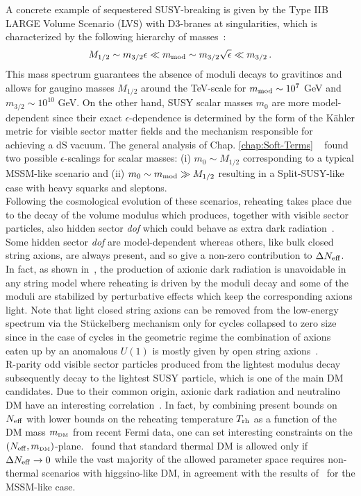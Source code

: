 \documentclass[12pt,a4paper]{book}
\def\DM{{\scriptscriptstyle \rm DM}}
\begin{document}
A concrete example of sequestered SUSY-breaking is given by the Type IIB LARGE Volume Scenario (LVS) with D3-branes at singularities, which is characterized by the following hierarchy of masses~\cite{Blumenhagen:2009gk}:
\begin{align}
M_{1/2}\sim m_{3/2} \epsilon \ll m_{\rm mod} \sim m_{3/2} \sqrt{\epsilon} \ll m_{3/2}\,.
\label{masses}
\end{align}
This mass spectrum guarantees the absence of moduli decays to gravitinos and allows for gaugino masses $M_{1/2}$ around the TeV-scale for $m_{\rm mod}\sim 10^7$ GeV and $m_{3/2}\sim 10^{10}$ GeV. On the other hand, SUSY scalar masses $m_0$ are more model-dependent since their exact $\epsilon$-dependence is determined by the form of the K\"ahler metric for visible sector matter fields and the mechanism responsible for achieving a dS vacuum. The general analysis of Chap. \ref{chap:Soft-Terms} ~\cite{Aparicio:2014wxa} found two possible $\epsilon$-scalings for scalar masses: (i) $m_0\sim M_{1/2}$ corresponding to a typical MSSM-like scenario and (ii) $m_0 \sim m_{\rm mod} \gg M_{1/2}$ resulting in a Split-SUSY-like case with heavy squarks and sleptons.\\

Following the cosmological evolution of these scenarios, reheating takes place due to the decay of the volume modulus which produces, together with visible sector particles, also hidden sector \textit{dof} which could behave as extra dark radiation~\cite{Cicoli:2012aq, Higaki:2012ar}. Some hidden sector \textit{dof} are model-dependent whereas others, like bulk closed string axions, are always present, and so give a non-zero contribution to $\Delta N_{\rm eff}$. In fact, as shown in~\cite{Allahverdi:2014ppa}, the production of axionic dark radiation is unavoidable in any string model where reheating is driven by the moduli decay and some of the moduli are stabilized by perturbative effects which keep the corresponding axions light. Note that light closed string axions can be removed from the low-energy spectrum via the St\"uckelberg mechanism only for cycles collapsed to zero size since in the case of cycles in the geometric regime the combination of axions eaten up by an anomalous $U(1)$ is mostly given by open string axions~\cite{Allahverdi:2014ppa}.\\

R-parity odd visible sector particles produced from the lightest modulus decay subsequently decay to the lightest SUSY particle, which is one of the main DM candidates. Due to their common origin, axionic dark radiation and neutralino DM have an interesting correlation~\cite{Allahverdi:2014ppa}. In fact, by combining present bounds on $N_{\rm eff}$ with lower bounds on the reheating temperature $T_{\rm rh}$ as a function of the DM mass $m_\DM$ from recent Fermi data, one can set interesting constraints on the $(N_{\rm eff}, m_\DM)$-plane.~\cite{Allahverdi:2014ppa} found that standard thermal DM is allowed only if $\Delta N_{\rm eff}\to 0$ while the vast majority of the allowed parameter space requires non-thermal scenarios with higgsino-like DM, in agreement with the results of~\cite{Aparicio:2015sda} for the MSSM-like case.\\
\end{document}
